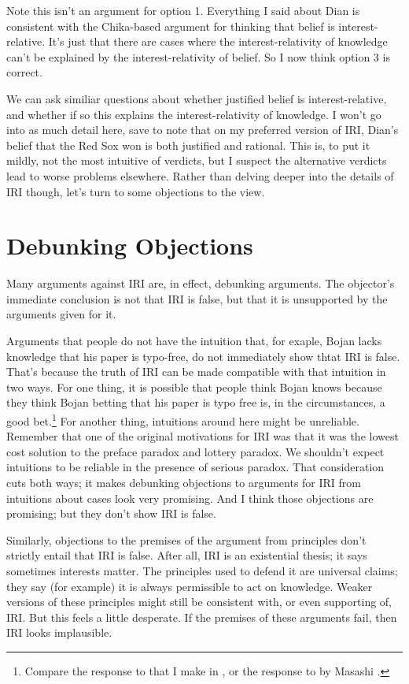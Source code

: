 Note this isn't an argument for option 1. Everything I said about Dian is consistent with the Chika-based argument for thinking that belief is interest-relative. It's just that there are cases where the interest-relativity of knowledge can't be explained by the interest-relativity of belief. So I now think option 3 is correct.

We can ask similiar questions about whether justified belief is interest-relative, and whether if so this explains the interest-relativity of knowledge. I won't go into as much detail here, save to note that on my preferred version of IRI, Dian's belief that the Red Sox won is both justified and rational. This is, to put it mildly, not the most intuitive of verdicts, but I suspect the alternative verdicts lead to worse problems elsewhere. Rather than delving deeper into the details of IRI though, let's turn to some objections to the view.

\section{Debunking Objections}
\label{debunkingobjections}

Many arguments against IRI are, in effect, debunking arguments. The objector's immediate conclusion is not that IRI is false, but that it is unsupported by the arguments given for it. 

Arguments that people do not have the intuition that, for exaple, Bojan lacks knowledge that his paper is typo-free, do not immediately show thtat IRI is false. That's because the truth of IRI can be made compatible with that intuition in two ways. For one thing, it is possible that people think Bojan knows because they think Bojan betting that his paper is typo free is, in the circumstances, a good bet.\footnote{Compare the response to  \citet{FeltzZarpentine2010} that I make in  \citet[§1]{Weatherson2011-WEADIR}, or the response to  \citet{Lackey2010} by Masashi  \citet[§5]{Kasaki2014}.} For another thing, intuitions around here might be unreliable. Remember that one of the original motivations for IRI was that it was the lowest cost solution to the preface paradox and lottery paradox. We shouldn't expect intuitions to be reliable in the presence of serious paradox. That consideration cuts both ways; it makes debunking objections to arguments for IRI from intuitions about cases look very promising. And I think those objections are promising; but they don't show IRI is false.

Similarly, objections to the premises of the argument from principles don't strictly entail that IRI is false. After all, IRI is an existential thesis; it says sometimes interests matter. The principles used to defend it are universal claims; they say (for example) it is always permissible to act on knowledge. Weaker versions of these principles might still be consistent with, or even supporting of, IRI. But this feels a little desperate. If the premises of these arguments fail, then IRI looks implausible.

